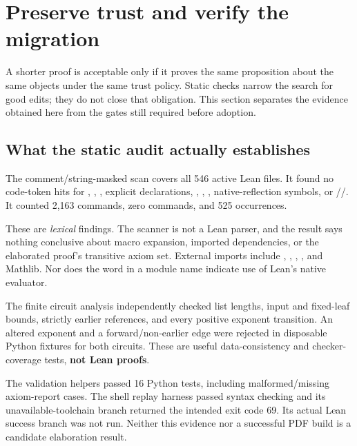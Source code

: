 \majorbreak
\section{Preserve trust and verify the migration}
\label{sec:validation}

A shorter proof is acceptable only if it proves the same proposition about
the same objects under the same trust policy. Static checks narrow the search
for good edits; they do not close that obligation. This section separates
the evidence obtained here from the gates still required before adoption.

\subsection{What the static audit actually establishes}

The comment/string-masked scan covers all 546 active Lean files. It found
no code-token hits for , , , explicit
 declarations, , ,
, native-reflection symbols, or
//. It counted 2,163
 commands, zero  commands, and 525
 occurrences.

These are \emph{lexical} findings. The scanner is not a Lean parser, and the
result says nothing conclusive about macro expansion, imported dependencies,
or the elaborated proof's transitive axiom set. External imports include
, , ,
, and Mathlib. Nor does the word  in a module
name indicate use of Lean's native evaluator.

The finite circuit analysis independently checked list lengths, input and
fixed-leaf bounds, strictly earlier references, and every positive exponent
transition. An altered exponent and a forward/non-earlier edge were
rejected in disposable Python fixtures for both circuits. These are useful
data-consistency and checker-coverage tests, \textbf{not Lean proofs}.

The validation helpers passed 16 Python tests, including malformed/missing
axiom-report cases. The shell replay harness passed syntax checking and its
unavailable-toolchain branch returned the intended exit code 69. Its actual
Lean success branch was not run. Neither this evidence nor a successful
PDF build is a candidate elaboration result.

